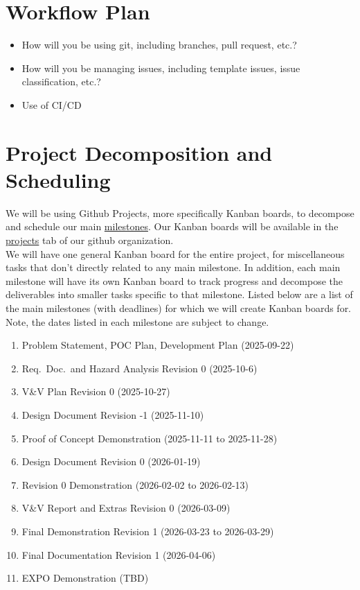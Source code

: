 \documentclass{article}
\begin{document}
\section{Workflow Plan}

\begin{itemize}
	\item How will you be using git, including branches, pull request, etc.?
	\item How will you be managing issues, including template issues, issue
	classification, etc.?
  \item Use of CI/CD
\end{itemize}

\section{Project Decomposition and Scheduling}

We will be using Github Projects, more specifically Kanban boards, to decompose and schedule our main \href{https://github.com/Team6-SixSense/audio360/milestones}{milestones}. 
Our Kanban boards will be available in the \href{https://github.com/orgs/Team6-SixSense/projects}{projects} tab of our github organization. \\

We will have one general Kanban board for the entire project, for miscellaneous tasks that don't directly related to any main milestone. 
In addition, each main milestone will have its own Kanban board to track progress and decompose the deliverables into smaller tasks specific to that milestone. 
Listed below are a list of the main milestones (with deadlines) for which we will create Kanban boards for. 
Note, the dates listed in each milestone are subject to change.

\begin{enumerate}
  \item Problem Statement, POC Plan, Development Plan (2025-09-22)
  \item Req.\ Doc.\ and Hazard Analysis Revision 0 (2025-10-6)
  \item V\&V Plan Revision 0 (2025-10-27)
  \item Design Document Revision -1 (2025-11-10)
  \item Proof of Concept Demonstration (2025-11-11 to 2025-11-28)
  \item Design Document Revision 0 (2026-01-19)
  \item Revision 0 Demonstration (2026-02-02 to 2026-02-13)
  \item V\&V Report and Extras Revision 0 (2026-03-09)
  \item Final Demonstration Revision 1 (2026-03-23 to 2026-03-29)
  \item Final Documentation Revision 1 (2026-04-06)
  \item EXPO Demonstration (TBD)
\end{enumerate}
\end{document}
